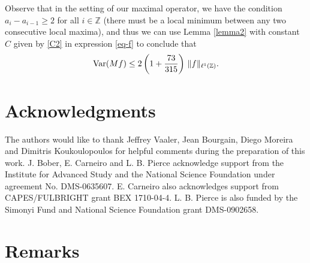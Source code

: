 \documentclass[reqno]{amsart}
\theoremstyle{definition}
\theoremstyle{remark}
\numberwithin{equation}{section}
\newcommand{\Z}{\mathbb{Z}}
\newcommand{\Var}{\text{\rm Var}}
\begin{document}
Observe that in the setting of our maximal operator, we have the condition $a_i - a_{i-1} \geq 2$ for all $i\in \Z$ (there must be a local minimum between any two consecutive local maxima), and thus we can use Lemma \ref{lemma2} with constant  $C$ given by \eqref{C2} in expression \eqref{eq-f} to conclude that 
\begin{equation*}
 \Var(Mf) \leq 2 \left(1 + \frac{73}{315}\right) \,\|f\|_{\ell^1(\Z)}.
\end{equation*}



\section*{Acknowledgments}
The authors would like to thank Jeffrey Vaaler, Jean Bourgain, Diego Moreira and Dimitris Koukoulopoulos for helpful comments during the preparation of this work. J. Bober, E. Carneiro and L. B. Pierce  acknowledge support from the Institute for Advanced Study and the National Science Foundation under agreement No. DMS-0635607. 
E. Carneiro also acknowledges support from CAPES/FULBRIGHT grant BEX 1710-04-4.
L. B. Pierce is also funded by the Simonyi Fund and National Science Foundation grant DMS-0902658.

\section*{Remarks}
\end{document}
